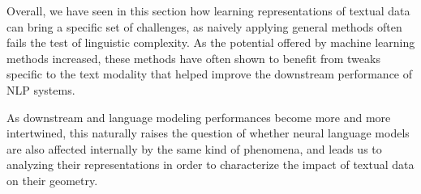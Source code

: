 Overall, we have seen in this section how learning representations of textual data can bring a specific set of challenges, as naively applying general methods often fails the test of linguistic complexity. As the potential offered by machine learning methods increased, these methods have often shown to benefit from tweaks specific to the text modality that helped improve the downstream performance of NLP systems.

As downstream and language modeling performances become more and more intertwined, this naturally raises the question of whether neural language models are also affected internally by the same kind of phenomena, and leads us to analyzing their representations in order to characterize the impact of textual data on their geometry.

\newpage